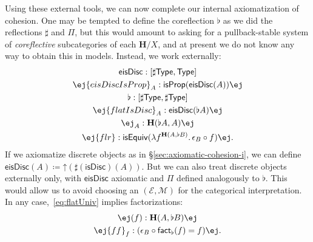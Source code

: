 \documentclass[copyright,12pt]{eptcs}
\makeatletter
\newcommand{\type}{\ensuremath{\mathsf{Type}}\xspace}
\renewcommand{\H}{\ensuremath{\mathbf{H}}\xspace}
\newcommand{\io}{\ensuremath{(\infty,1)}}
\newcommand{\E}{\ensuremath{\mathcal{E}}\xspace}
\newcommand{\M}{\ensuremath{\mathcal{M}}\xspace}
\newcommand{\esc}{\ensuremath{\mathord{\uparrow}}}
\newcommand{\factflat}{\textsf{fact}_{\flat}}
\def\jd#1{\@jd#1\ej}
\def\@jd#1|-#2\ej{\@@jd#1,,\;\vdash\;\left(#2\right)}
\def\@@jd#1,{\@ifmtarg{#1}{\let\next=\relax}{\left(#1\right)\let\next=\@@@jd}\next}
\def\@@@jd#1,{\@ifmtarg{#1}{\let\next=\relax}{,\,\left(#1\right)\let\next=\@@@jd}\next}
\def\cm{,}
\makeatother
\begin{document}
Using these external tools, we can now complete our internal axiomatization of cohesion.
One may be tempted to define the coreflection $\flat$ as we did the reflections $\sharp$ and $\Pi$, but
this would amount to asking for a pullback-stable system of \emph{coreflective} subcategories of each $\H/X$, and at present we do not know any way to obtain this in models.
Instead, we work externally:
\begin{gather}
  \mathsf{eisDisc} : [\sharp\type,\type]\\
  \jd{A:\sharp\type |- \mathsf{eisDiscIsProp}_A : \mathsf{isProp}(\mathsf{eisDisc}(A))}\\
  \flat:[\sharp\type,\sharp\type]\\
  \jd{A:\sharp\type |- \mathsf{flatIsDisc}_A : \mathsf{eisDisc}(\flat A)}\\
  \jd{A:\sharp \type |- \epsilon_A : \H(\flat A, A)}\label{flatCounit}\\
  \jd{A\cm B:\sharp \type, \mathsf{ad} : \mathsf{eisDisc}(A) |-
    \mathsf{flr} : \mathsf{isEquiv}(\lambda f^{{\H(A,\flat B)}} . \, \epsilon_B \circ f)}.\label{eq:flatUniv}
\end{gather}
If we axiomatize discrete objects
as in \S\ref{sec:axiomatic-cohesion-i}, we can define
$\mathsf{eisDisc}(A) \coloneqq \esc(\sharp(\mathsf{isDisc})(A))$.
But we can also treat discrete objects externally only, with $\mathsf{eisDisc}$ axiomatic and $\Pi$ defined analogously to $\flat$.
This would allow us %
to avoid choosing an $(\E,\M)$ for the categorical interpretation.
In any case,~\eqref{eq:flatUniv} implies factorizations:
\begin{gather*}
  \jd{\mathsf{ad}:\mathsf{eisDisc}(A), f:{\H(A,B)} |- \factflat(f):{\H(A,\flat B)}} \\
  \jd{\mathsf{ad}:\mathsf{eisDisc}(A), f:{\H(A,B)} |- \mathsf{ff}_f:(\epsilon_B \circ \factflat(f) = f)}.
\end{gather*}
\end{document}
